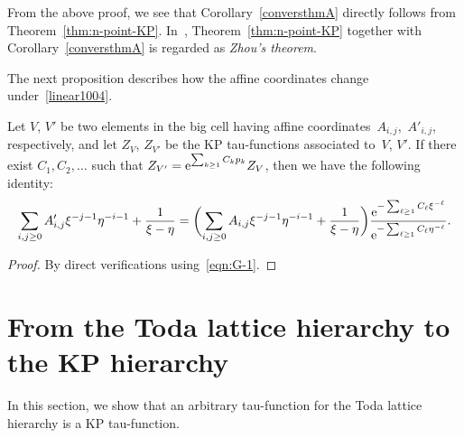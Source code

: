 \begin{Remark}
From the above proof, we see that Corollary~\ref{conversthmA} directly follows from Theorem~\ref{thm:n-point-KP}. In~\cite{ABDBKS},
Theorem~\ref{thm:n-point-KP} together with Corollary~\ref{conversthmA} is regarded as {\it Zhou's theorem}.
\end{Remark}

The next proposition describes how the affine coordinates change under~\eqref{linear1004}.

\begin{Proposition}\label{VVprimelinear}
Let $V$, $V'$ be two elements in the big cell having affine coordinates~$A_{i,j}$,~$A'_{i,j}$, respectively,
and let $Z_V$, $Z_{V'}$ be the KP tau-functions associated to~$V$, $V'$. If there exist $C_1,C_2,\dots$ such that
$
Z_{V'} = {\rm e}^{\sum_{k\ge1} C_k p_k} Z_V$,
then we have the following identity:
\begin{gather*}%
\sum_{i,j \geq 0} A'_{i,j} \xi^{-j-1} \eta^{-i-1} + \frac1{\xi-\eta} = \biggl(\sum_{i,j \geq 0} A_{i,j} \xi^{-j-1} \eta^{-i-1} + \frac1{\xi-\eta}\biggr)
\frac{{\rm e}^{-\sum_{\ell\ge1} C_\ell \xi^{-\ell}}}{{\rm e}^{-\sum_{\ell\ge1} C_\ell \eta^{-\ell}}}.
\end{gather*}
\end{Proposition}
\begin{proof}
By direct verifications using~\eqref{eqn:G-1}.
\end{proof}

\section{From the Toda lattice hierarchy to the KP hierarchy}\label{sectionToda}
In this section, we show that an arbitrary tau-function for the Toda lattice hierarchy is a KP tau-function.

